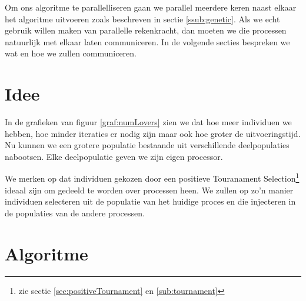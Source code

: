 

Om ons algoritme te parallelliseren gaan we parallel meerdere keren naast elkaar het algoritme uitvoeren zoals beschreven in sectie \ref{ssub:genetic}. Als we echt gebruik willen maken van parallelle rekenkracht, dan moeten we die processen natuurlijk met elkaar laten communiceren.   In de volgende secties bespreken we wat en hoe we zullen communiceren.
\section{Idee}
\label{sec:idee}
In de grafieken van figuur \ref{graf:numLovers} zien we dat hoe meer individuen we hebben, hoe minder iteraties er nodig zijn maar ook hoe groter de uitvoeringstijd. Nu kunnen we een grotere populatie bestaande uit verschillende deelpopulaties nabootsen. Elke deelpopulatie geven we zijn eigen processor.  

We merken op dat individuen gekozen door een positieve Touranament Selection\footnote{zie sectie \ref{sec:positiveTournament} en \ref{sub:tournament}} ideaal zijn om gedeeld te worden over processen heen. We zullen op zo'n manier individuen selecteren uit de populatie van het huidige proces en die injecteren in de populaties van de andere processen. 

\section{Algoritme}


